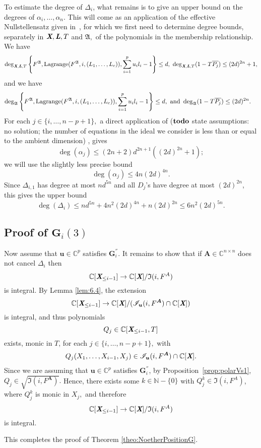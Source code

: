 \documentclass[a4paper]{article}
\def\A{\mathfrak{A}}
\def\Lb{\textit{\textbf{L}}}
\def\Xb{\textit{\textbf{X}}}
\def\mA{{\bm A}}
\def\ub{{\bm u}}
\def\pjb{\overline{P_{j}}}
\def\D{\Delta}
\DeclareMathOperator{\lag}{Lagrange}
\def\C{\mathbb{C}}
\def\IiA{\mathfrak{I}(i,F^A)}
\def\IiAr{\sqrt{\mathfrak{I}(i,F^{\mA})}}
\def\lagFfA{{\bm\lag}(F^{\A},i,(L_1,\hdots,L_c))}
\def\IilA{\mathscr{I}_{\ub}(i,F^{\mA})}
\def\udl{\sum_{i=1}^pu_il_i}
\def\td{{\bf todo}}
\begin{document}
\noindent
To estimate the degree of $\D_{i}$, what remains is to give an upper
bound on the degrees of $\alpha_i,\dots,\alpha_n$. This will come as an
application of the effective Nullstellensatz given in~\cite{EN}, for
which we first need to determine degree bounds, separately in $\Xb,\Lb,T$
and $\A,$ of the polynomials in the membership relationship. We have
\begin{align*}
\deg_{\Xb,\Lb,T}
\left\{ 
F^{\A},\lagFfA, \udl-1
\right\}
\leq d, ~
\deg_{\Xb,\Lb,T}(1-T\pjb) \leq (2d)^{2n} +1, 
\end{align*}
and we have 
\begin{align*}
\deg_{\A}  
\left\{ 
F^{\A},\lagFfA, \udl-1
\right\} 
\leq d,~\textrm{and }
\deg_{\A}(1-T\pjb)& \leq (2d)^{2n}.
\end{align*}
For each $j \in \{i,\hdots,n-p+1\},$ a direct application of ($\td$ state assumptions: no solution; the number of equations in the ideal we consider is less than or equal to the ambient dimension) \cite[Theorem
0.5]{EN}, gives 
\[
\deg(\alpha_j) \le (2n+2)d^{2n+1}((2d)^{2n}+1);
\]
we will use
the slightly less precise bound \[\deg(\alpha_j) \le 4n(2d)^{4n}.\] Since $\D_{i,1}$ has degree at most
$nd^{5n}$ and all $D_j$'s have degree at most $(2d)^{2n}$, this gives
the upper bound
$$\deg(\D_i) \le nd^{5n} +  4n^2(2d)^{4n} + n(2d)^{2n} \leq 6n^2(2d)^{5n}.$$


\subsection{Proof of $\textbf{G}_i(3)$}
Now assume that $\ub \in \C^p$ satisfies $\bm G_i^{''}$. It remains to show that if $\mA \in \C^{n\times n}$ does not cancel $\D_{i}$ then
\[
 \C[\Xb_{\leq i-1}]\rightarrow \C[\Xb]/\IiA
\]
is integral. 
\noindent
By Lemma \ref{lem:6.4}, the extension
\[
 \C[\Xb_{\leq i-1}]\rightarrow \C[\Xb]/(\IilA \cap \C[\Xb])
\]
is integral, and thus polynomials 
\[
Q_j \in \C[\Xb_{\leq i-1},T]
\]
exists, monic in $T$, for each $j \in \{i,\hdots,n-p+1\},$ with
\begin{align*}
Q_j(X_1,\hdots,X_{i-1},X_j) \in \IilA \cap \C[\Xb].
\end{align*}
%
Since we are assuming that $\ub \in \C^p$ satisfies $\bm G_i^{''}$, by Proposition~\ref{prop:polarVs1}, $Q_j \in \IiAr.$ Hence, there exists some $k \in \mathbb{N}-\{0\}$ with $Q_j^{k} \in\IiA$, where $Q_j^k$ is monic in $X_j,$ and therefore
\[
 \C[\Xb_{\leq i-1}]\rightarrow \C[\Xb]/\IiA
\]
is integral.
\par 
This completes the proof of Theorem \ref{theo:NoetherPositionG}.
\end{document}
